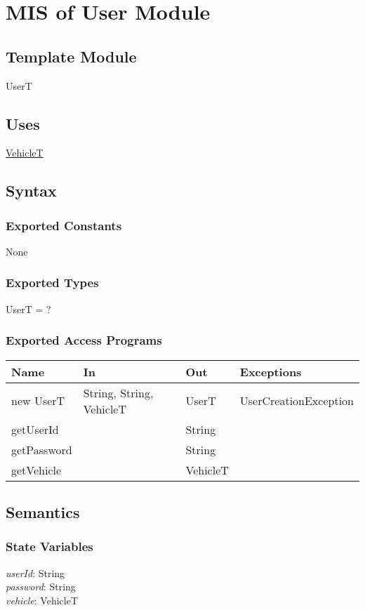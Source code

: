 \documentclass[12pt, titlepage]{article}
\begin{document}
\newpage

\section{MIS of User Module} 
\label{user:Module}

\subsection{Template Module}
UserT

\subsection{Uses}
\hyperref[vehicle:Module]{VehicleT}

\subsection{Syntax}

\subsubsection{Exported Constants}
None

\subsubsection{Exported Types}
UserT = ?

\subsubsection{Exported Access Programs}


\begin{tabular}{p{2cm} p{5cm} p{2cm} p{4cm}}
\hline
\textbf{Name} & \textbf{In} & \textbf{Out} & \textbf{Exceptions} \\
\hline
new UserT & String, String, VehicleT & UserT & UserCreationException \\
getUserId & ~ & String & ~ \\
getPassword & ~ & String & ~ \\
getVehicle & ~ & VehicleT & ~ \\
\hline
\end{tabular}

\subsection{Semantics}

\subsubsection{State Variables}
\textit{userId}: String \\
\textit{password}: String \\
\textit{vehicle}: VehicleT
\end{document}
